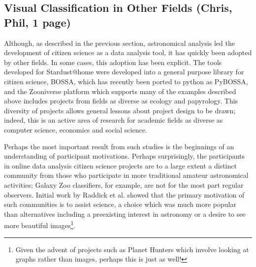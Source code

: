 \documentclass{ar2e}
\begin{document}
\subsection{Visual Classification in Other Fields (\textbf{Chris}, Phil, 1 page)}
\label{sec:class:non-astro}

Although, as described in the previous section, astronomical analysis led the
development of citizen science as a data analysis tool, it has quickly been
adopted by other fields. In some cases, this adoption has been explicit. The
tools developed for Stardust@home were developed into a general purpose
library for citizen science, BOSSA, which has recently been ported to python
as PyBOSSA, and the Zooniverse platform which supports many of the examples
described above includes projects from fields as diverse as ecology and
papyrology. This diversity of projects allows general lessons about project
design to be drawn; indeed, this is an active area of research for academic
fields as diverse as computer science, economics and social science. 


Perhaps the most important result from such studies is the beginnings of an
understanding of participant motivations. Perhaps surprisingly, the
participants in online data analysis citizen science projects are to a large
extent a distinct community from those who participate in more traditional
amateur astronomical activities; Galaxy Zoo classifiers, for example, are not
for the most part regular observers. Initial work by Raddick et al. showed
that the primary motivation of such communities is to assist science, a choice
which was much more popular than alternatives including a preexisting interest
in astronomy or a desire to see more beautiful images\footnote{Given the
advent of projects such as Planet Hunters which involve looking at graphs
rather than images, perhaps this is just as well!}. 

\end{document}
